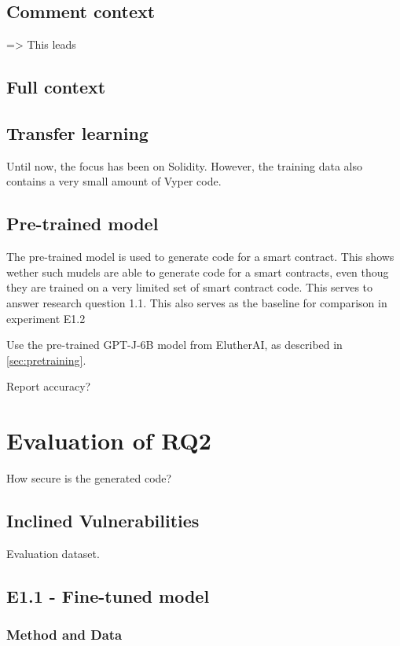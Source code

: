 \subsection{Comment context}
=> This leads

\subsection{Full context}

\subsection{Transfer learning}
Until now, the focus has been on Solidity. However, the training data also contains a very small amount of Vyper code. 

\subsection{Pre-trained model}
\label{sec:eval-pre-trained-model}
The pre-trained model is used to generate code for a smart contract. This shows wether such mudels are able to generate code for a smart contracts, even thoug they are trained on a very limited set of smart contract code. This serves to answer research  question 1.1. This also serves as the baseline for comparison in experiment E1.2

Use the pre-trained GPT-J-6B model from ElutherAI, as described in \cref{sec:pretraining}.

Report accuracy?


\section{Evaluation of RQ2}
How secure is the generated code?

\subsection{Inclined Vulnerabilities}
\label{sec:inclined-vulnerabilities}

Evaluation dataset.


\subsection{E1.1 - Fine-tuned model}
\label{sec:e2.1-fine-tuned-model}

\subsubsection{Method and Data}
